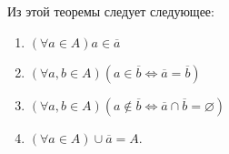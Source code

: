 Из этой теоремы следует следующее:
\begin{enumerate}[left=0.0em, labelsep=1em, topsep=0.0em, itemsep=0pt, parsep=0.5em]
    \item $(\forall a \in A) a \in \overline{a}$
    \item $(\forall a,b \in A) (a \in \overline{b} \Leftrightarrow \overline{a} = \overline{b})$
    \item $(\forall a,b \in A) (a \notin \overline{b} \Leftrightarrow \overline{a} \cap \overline{b} = \varnothing)$
    \item $(\forall a \in A) \cup \overline{a} = A$.
\end{enumerate}